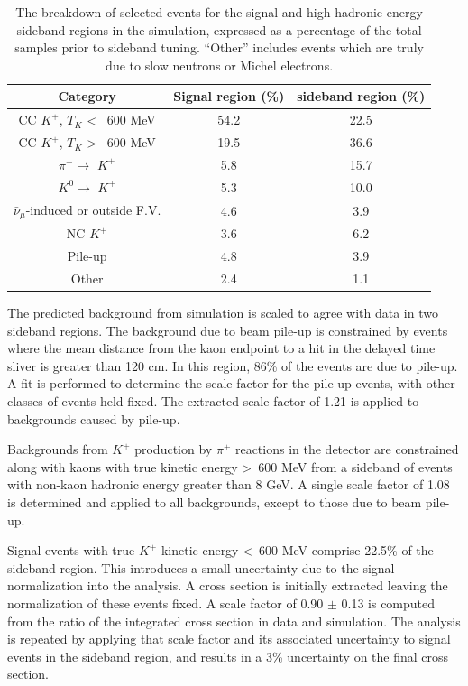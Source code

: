 \documentclass[aps,prl,preprint,showpacs,superscriptaddress,nofootinbib,floatfix,linenumbers]{revtex4}
\newcommand{\pip}{\ensuremath{\pi^{+}}\xspace}
\newcommand{\kp}{\ensuremath{K^{+}}\xspace}
\newcommand{\kz}{\ensuremath{K^{0}}\xspace}
\begin{document}
\begingroup
\squeezetable
\begin{table}
\begin{tabular}{ccc}
\hline\hline
Category & Signal region (\%) & sideband region (\%) \\
\hline
CC \kp, $T_{K}$ \textless~ 600 MeV & 54.2 & 22.5 \\
CC \kp, $T_{K}$ \textgreater~ 600 MeV & 19.5 & 36.6 \\
\pip $\rightarrow$ \kp & 5.8 & 15.7 \\
\kz $\rightarrow$ \kp & 5.3 & 10.0 \\
$\bar{\nu}_{\mu}$-induced or outside F.V. & 4.6 & 3.9 \\
NC \kp & 3.6 & 6.2 \\
Pile-up & 4.8 & 3.9 \\
Other & 2.4 & 1.1 \\
\hline\hline
\end{tabular}
\caption{The breakdown of selected events for the signal and high hadronic energy sideband regions in the simulation, expressed as a percentage of the total samples prior to sideband tuning. ``Other'' includes events which are truly due to slow neutrons or Michel electrons.}
\label{tab:bkg}
\end{table}
\endgroup

The predicted background from simulation is scaled to agree with data in two sideband regions. The background due to beam pile-up is constrained by events where the mean distance from the kaon endpoint to a hit in the delayed time sliver is greater than 120 cm. In this region, 86\% of the events are due to pile-up. A fit is performed to determine the scale factor for the pile-up events, with other classes of events held fixed. The extracted scale factor of 1.21 is applied to backgrounds caused by pile-up.

Backgrounds from \kp production by \pip reactions in the detector are constrained along with kaons with true kinetic energy \textgreater~600 MeV from a sideband of events with non-kaon hadronic energy greater than 8 GeV. A single scale factor of 1.08 is determined and applied to all backgrounds, except to those due to beam pile-up.

Signal events with true \kp kinetic energy \textless~600 MeV comprise 22.5\% of the sideband region. This introduces a small uncertainty due to the signal normalization into the analysis. A cross section is initially extracted leaving the normalization of these events fixed. A scale factor of 0.90 $\pm$ 0.13 is computed from the ratio of the integrated cross section in data and simulation. The analysis is repeated by applying that scale factor and its associated uncertainty to signal events in the sideband region, and results in a 3\% uncertainty on the final cross section. 
\end{document}
